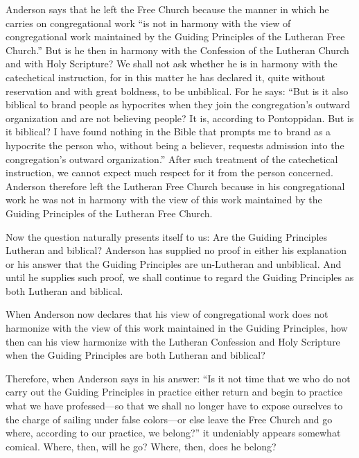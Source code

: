 Anderson says that he left the Free Church because the manner in which he carries on congregational work “is not in harmony with the view of congregational work maintained by the Guiding Principles of the Lutheran Free Church.” But is he then in harmony with the Confession of the Lutheran Church and with Holy Scripture? We shall not ask whether he is in harmony with the catechetical instruction, for in this matter he has declared it, quite without reservation and with great boldness, to be unbiblical. For he says: “But is it also biblical to brand people as hypocrites when they join the congregation’s outward organization and are not believing people? It is, according to Pontoppidan. But is it biblical? I have found nothing in the Bible that prompts me to brand as a hypocrite the person who, without being a believer, requests admission into the congregation’s outward organization.” After such treatment of the catechetical instruction, we cannot expect much respect for it from the person concerned. Anderson therefore left the Lutheran Free Church because in his congregational work he was not in harmony with the view of this work maintained by the Guiding Principles of the Lutheran Free Church.

Now the question naturally presents itself to us: Are the Guiding Principles Lutheran and biblical? Anderson has supplied no proof in either his explanation or his answer that the Guiding Principles are un-Lutheran and unbiblical. And until he supplies such proof, we shall continue to regard the Guiding Principles as both Lutheran and biblical.

When Anderson now declares that his view of congregational work does not harmonize with the view of this work maintained in the Guiding Principles, how then can his view harmonize with the Lutheran Confession and Holy Scripture when the Guiding Principles are both Lutheran and biblical?

Therefore, when Anderson says in his answer: “Is it not time that we who do not carry out the Guiding Principles in practice either return and begin to practice what we have professed—so that we shall no longer have to expose ourselves to the charge of sailing under false colors—or else leave the Free Church and go where, according to our practice, we belong?” it undeniably appears somewhat comical. Where, then, will he go? Where, then, does he belong?

